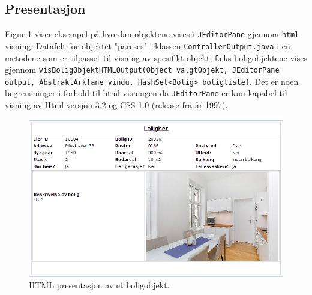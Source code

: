 \subsection{Presentasjon}
Figur \ref{fig:presentasjon} viser eksempel på hvordan objektene vises i \texttt{JEditorPane} gjennom \texttt{html}-visning. Datafelt for objektet "pareses" i klassen \texttt{ControllerOutput.java} i en metodene som er tilpasset til visning av spesifikt objekt, f.eks boligobjektene vises gjennom \texttt{visBoligObjektHTMLOutput(Object valgtObjekt, JEditorPane output, AbstraktArkfane vindu, HashSet<Bolig> boligliste)}. Det er noen begrensninger i forhold til html visningen da \texttt{JEditorPane} er kun kapabel til visning av Html versjon 3.2 og CSS 1.0 (release fra år 1997). 

\begin{figure}[ht!]
 \includegraphics[width=\textwidth,height=\textheight,keepaspectratio]{./img/produktdokumentasjon/visuelle_detaljer/presentasjon.png}
 \caption{HTML presentasjon av et boligobjekt.}
 \label{fig:presentasjon}
\end{figure}


